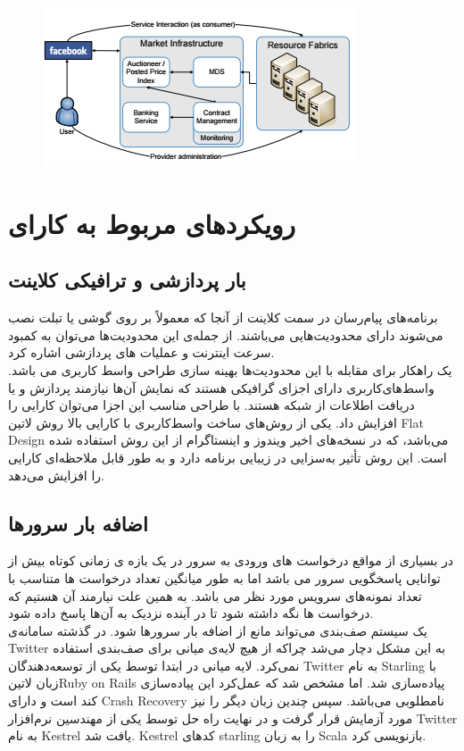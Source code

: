 \begin{figure}[H]
\centering
\includegraphics[scale=1]{img/social-cloud.png}
\label{fig:social-cloud}
\end{figure}

\section{رویکردهای مربوط به کارای}
\subsection{بار پردازشی و ترافیکی کلاینت}
برنامه‌های پیام‌رسان در سمت کلاینت از آنجا که معمولاً بر روی گوشی یا تبلت نصب می‌شوند دارای محدودیت‌هایی می‌باشند. از جمله‌ی این محدودیت‌ها می‌توان به کمبود سرعت اینترنت و عملیات های پردازشی اشاره کرد.\\
یک راهکار برای مقابله با این محدودیت‌ها بهینه سازی طراحی واسط کاربری می باشد. واسط‌های‌کاربری دارای اجزای گرافیکی هستند که نمایش آن‌ها نیازمند پردازش و یا دریافت اطلاعات از شبکه هستند. با طراحی مناسب این اجزا می‌توان کارایی را افزایش داد. یکی از روش‌های ساخت واسط‌کاربری با کارایی بالا روش ‌لاتین{ Flat Design } می‌باشد، که در نسخه‌های اخیر ویندوز و اینستاگرام از این روش استفاده شده است. این روش تأثیر به‌سزایی در زیبایی برنامه دارد و به طور قابل ملاحظه‌ای کارایی را افزایش می‌دهد.

\subsection{اضافه بار سرور‌ها}
در بسیاری از مواقع درخواست های ورودی به سرور در یک بازه ی زمانی کوتاه بیش از توانایی پاسخگویی سرور می  باشد اما به طور میانگین تعداد درخواست ها متناسب با تعداد نمونه‌های سرویس مورد نظر می باشد. به همین علت نیارمند آن هستیم که درخواست ها نگه داشته شود تا در آینده نزدیک به آن‌ها پاسخ داده شود.\\
یک سیستم صف‌بندی می‌تواند مانع از اضافه بار سرور‌ها شود. در گذشته سامانه‌ی Twitter به این مشکل دچار می‌شد چراکه از هیچ لایه‌ی میانی برای صف‌بندی استفاده نمی‌کرد. لایه میانی در ابتدا توسط یکی از توسعه‌دهندگان Twitter به نام Starling  با زبان ‌لاتین{Ruby on Rails} پیاده‌سازی شد. اما مشخص شد که عمل‌کرد  این پیاده‌سازی کند است و دارای Crash Recovery نامطلوبی می‌باشد. سپس چندین زبان دیگر را نیز مورد آزمایش قرار گرفت و در نهایت راه حل توسط یکی از مهندسین نرم‌افزار Twitter به نام Kestrel یافت شد. Kestrel کدهای starling را به زبان Scala باز‌نویسی کرد.  
